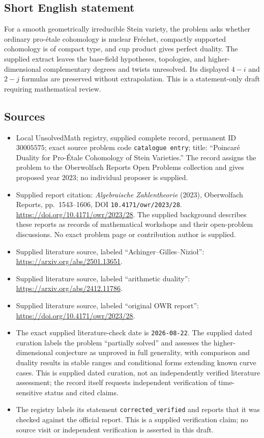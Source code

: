 \documentclass[11pt]{article}
\begin{document}
\subsection{Short English statement}
For a smooth geometrically irreducible Stein variety, the problem asks whether ordinary pro-\'etale cohomology is nuclear Fr\'echet, compactly supported cohomology is of compact type, and cup product gives perfect duality. The supplied extract leaves the base-field hypotheses, topologies, and higher-dimensional complementary degrees and twists unresolved. Its displayed \(4-i\) and \(2-j\) formulas are preserved without extrapolation. This is a statement-only draft requiring mathematical review.
\subsection{Sources}
\begin{itemize}
\item Local UnsolvedMath registry, supplied complete record, permanent ID \(30005575\); exact source problem code \texttt{catalogue entry}; title: ``Poincar\'e Duality for Pro-\'Etale Cohomology of Stein Varieties.'' The record assigns the problem to the Oberwolfach Reports Open Problems collection and gives proposed year \(2023\); no individual proposer is supplied.
\item Supplied report citation: \emph{Algebraische Zahlentheorie} (2023), Oberwolfach Reports, pp.\ 1543--1606, DOI \texttt{10.4171/owr/2023/28}. \url{https://doi.org/10.4171/owr/2023/28}. The supplied background describes these reports as records of mathematical workshops and their open-problem discussions. No exact problem page or contribution author is supplied.
\item Supplied literature source, labeled ``Achinger--Gilles--Nizio\l'': \url{https://arxiv.org/abs/2501.13651}.
\item Supplied literature source, labeled ``arithmetic duality'': \url{https://arxiv.org/abs/2412.11786}.
\item Supplied literature source, labeled ``original OWR report'': \url{https://doi.org/10.4171/owr/2023/28}.
\item The exact supplied literature-check date is \texttt{2026-08-22}. The supplied dated curation labels the problem ``partially solved'' and assesses the higher-dimensional conjecture as unproved in full generality, with comparison and duality results in stable ranges and conditional forms extending known curve cases. This is supplied dated curation, not an independently verified literature assessment; the record itself requests independent verification of time-sensitive status and cited claims.
\item The registry labels its statement \texttt{corrected\_verified} and reports that it was checked against the official report. This is a supplied verification claim; no source visit or independent verification is asserted in this draft.
\end{itemize}
\end{document}
